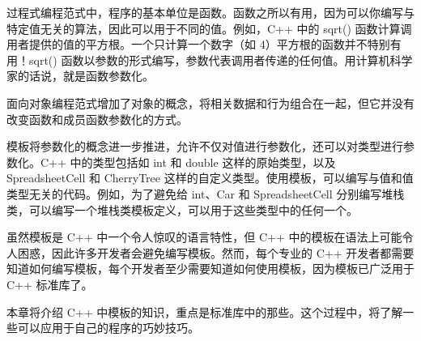 过程式编程范式中，程序的基本单位是函数。函数之所以有用，因为可以你编写与特定值无关的算法，因此可以用于不同的值。例如，C++ 中的 sqrt() 函数计算调用者提供的值的平方根。一个只计算一个数字（如 4）平方根的函数并不特别有用！sqrt() 函数以参数的形式编写，参数代表调用者传递的任何值。用计算机科学家的话说，就是函数参数化。

面向对象编程范式增加了对象的概念，将相关数据和行为组合在一起，但它并没有改变函数和成员函数参数化的方式。

模板将参数化的概念进一步推进，允许不仅对值进行参数化，还可以对类型进行参数化。C++ 中的类型包括如 int 和 double 这样的原始类型，以及 SpreadsheetCell 和 CherryTree 这样的自定义类型。使用模板，可以编写与值和值类型无关的代码。例如，为了避免给 int、Car 和 SpreadsheetCell 分别编写堆栈类，可以编写一个堆栈类模板定义，可以用于这些类型中的任何一个。

虽然模板是 C++ 中一个令人惊叹的语言特性，但 C++ 中的模板在语法上可能令人困惑，因此许多开发者会避免编写模板。然而，每个专业的 C++ 开发者都需要知道如何编写模板，每个开发者至少需要知道如何使用模板，因为模板已广泛用于 C++ 标准库了。

本章将介绍 C++ 中模板的知识，重点是标准库中的那些。这个过程中，将了解一些可以应用于自己的程序的巧妙技巧。

